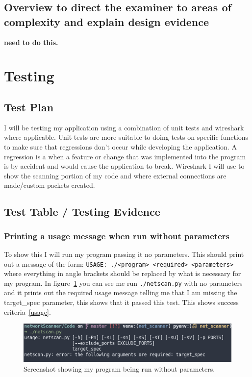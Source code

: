 \documentclass[titlepage]{article}
\let\Oldsection\section{}
\renewcommand{\section}{\FloatBarrier\Oldsection}
\let\Oldsubsection\subsection{}
\renewcommand{\subsection}{\FloatBarrier\Oldsubsection}
\let\Oldsubsubsection\subsubsection{}
\renewcommand{\subsubsection}{\FloatBarrier\Oldsubsubsection}
\begin{document}
\subsection{Overview to direct the examiner to areas of complexity and explain design evidence}

\textbf{\color{red} need to do this.}

\section{Testing}

\subsection{Test Plan}

I will be testing my application using a combination of unit tests and wireshark where applicable.
Unit tests are more suitable to doing tests on specific functions to make sure that regressions don't occur while developing
the application. A regression is a when a feature or change that was implemented into the program is by accident and would 
cause the application to break. Wireshark I will use to show the scanning portion of my code and where external connections
are made/custom packets created.

\subsection{Test Table / Testing Evidence}

\subsubsection{Printing a usage message when run without parameters}

To show this I will run my program passing it no parameters.
This should print out a message of the form: \verb|USAGE: ./<program> <required> <parameters>|
where everything in angle brackets should be replaced by what is necessary for my program. 
In figure~\ref{noparametertest} you can see me run \verb|./netscan.py| with no parameters and it
prints out the required usage message telling me that I am missing the target\_spec parameter, this
shows that it passed this test.
This shows success criteria~\ref{usage}.
\begin{figure}[H]
  \centering
  \includegraphics[width=\textwidth]{screenshots/noparameters.png}
  \caption{%
    Screenshot showing my program being run without parameters.
  }\label{noparametertest}
\end{figure}
\end{document}
